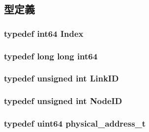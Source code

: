 \subsection{型定義}
\hypertarget{TypeDefines_8hh_a39642de41f3574937f399f4fab25ba18}{
\subsubsection[{Index}]{\setlength{\rightskip}{0pt plus 5cm}typedef {\bf int64} {\bf Index}}}
\label{TypeDefines_8hh_a39642de41f3574937f399f4fab25ba18}
\hypertarget{TypeDefines_8hh_aecfc3c54bd29ad5964e1c1c3ccbf89df}{
\subsubsection[{int64}]{\setlength{\rightskip}{0pt plus 5cm}typedef long long {\bf int64}}}
\label{TypeDefines_8hh_aecfc3c54bd29ad5964e1c1c3ccbf89df}
\hypertarget{TypeDefines_8hh_ab5106a4c9f29d7d11860745608da944d}{
\subsubsection[{LinkID}]{\setlength{\rightskip}{0pt plus 5cm}typedef unsigned int {\bf LinkID}}}
\label{TypeDefines_8hh_ab5106a4c9f29d7d11860745608da944d}
\hypertarget{TypeDefines_8hh_a83c14b4ae37e80071f6b3506a6c46151}{
\subsubsection[{NodeID}]{\setlength{\rightskip}{0pt plus 5cm}typedef unsigned int {\bf NodeID}}}
\label{TypeDefines_8hh_a83c14b4ae37e80071f6b3506a6c46151}
\hypertarget{TypeDefines_8hh_a7901e1a365850c5ff38ec6e12b6b9ffc}{
\subsubsection[{physical\_\-address\_\-t}]{\setlength{\rightskip}{0pt plus 5cm}typedef {\bf uint64} {\bf physical\_\-address\_\-t}}}
